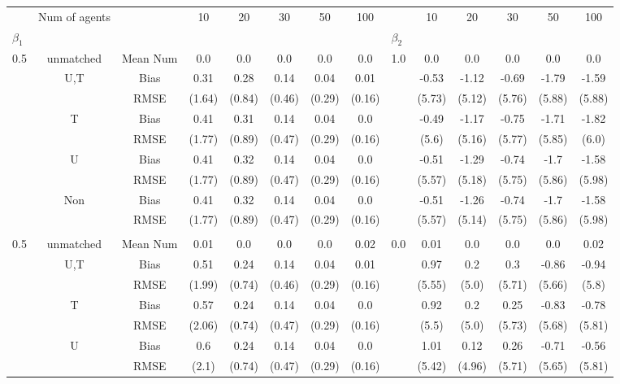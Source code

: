 \begin{tabular}{@{\extracolsep{5pt}}lc|cccccc|lccccc}
\toprule 
 & Num of agents &  & 10 & 20 & 30 & 50 & 100 &  & 10 & 20 & 30 & 50 & 100 \\
$\beta_1$ &  &  &  &  &  &  &  & $\beta_2$ &  &  &  &  &  \\
\midrule 
0.5 & unmatched & Mean Num & 0.0 & 0.0 & 0.0 & 0.0 & 0.0 & 1.0 & 0.0 & 0.0 & 0.0 & 0.0 & 0.0 \\
 & U,T & Bias & 0.31 & 0.28 & 0.14 & 0.04 & 0.01 &  & -0.53 & -1.12 & -0.69 & -1.79 & -1.59 \\
 &  & RMSE & (1.64) & (0.84) & (0.46) & (0.29) & (0.16) &  & (5.73) & (5.12) & (5.76) & (5.88) & (5.88) \\
 & T & Bias & 0.41 & 0.31 & 0.14 & 0.04 & 0.0 &  & -0.49 & -1.17 & -0.75 & -1.71 & -1.82 \\
 &  & RMSE & (1.77) & (0.89) & (0.47) & (0.29) & (0.16) &  & (5.6) & (5.16) & (5.77) & (5.85) & (6.0) \\
 & U & Bias & 0.41 & 0.32 & 0.14 & 0.04 & 0.0 &  & -0.51 & -1.29 & -0.74 & -1.7 & -1.58 \\
 &  & RMSE & (1.77) & (0.89) & (0.47) & (0.29) & (0.16) &  & (5.57) & (5.18) & (5.75) & (5.86) & (5.98) \\
 & Non & Bias & 0.41 & 0.32 & 0.14 & 0.04 & 0.0 &  & -0.51 & -1.26 & -0.74 & -1.7 & -1.58 \\
 &  & RMSE & (1.77) & (0.89) & (0.47) & (0.29) & (0.16) &  & (5.57) & (5.14) & (5.75) & (5.86) & (5.98) \\
 &  &  &  &  &  &  &  &  &  &  &  &  &  \\
0.5 & unmatched & Mean Num & 0.01 & 0.0 & 0.0 & 0.0 & 0.02 & 0.0 & 0.01 & 0.0 & 0.0 & 0.0 & 0.02 \\
 & U,T & Bias & 0.51 & 0.24 & 0.14 & 0.04 & 0.01 &  & 0.97 & 0.2 & 0.3 & -0.86 & -0.94 \\
 &  & RMSE & (1.99) & (0.74) & (0.46) & (0.29) & (0.16) &  & (5.55) & (5.0) & (5.71) & (5.66) & (5.8) \\
 & T & Bias & 0.57 & 0.24 & 0.14 & 0.04 & 0.0 &  & 0.92 & 0.2 & 0.25 & -0.83 & -0.78 \\
 &  & RMSE & (2.06) & (0.74) & (0.47) & (0.29) & (0.16) &  & (5.5) & (5.0) & (5.73) & (5.68) & (5.81) \\
 & U & Bias & 0.6 & 0.24 & 0.14 & 0.04 & 0.0 &  & 1.01 & 0.12 & 0.26 & -0.71 & -0.56 \\
 &  & RMSE & (2.1) & (0.74) & (0.47) & (0.29) & (0.16) &  & (5.42) & (4.96) & (5.71) & (5.65) & (5.81) \\

\end{tabular}
